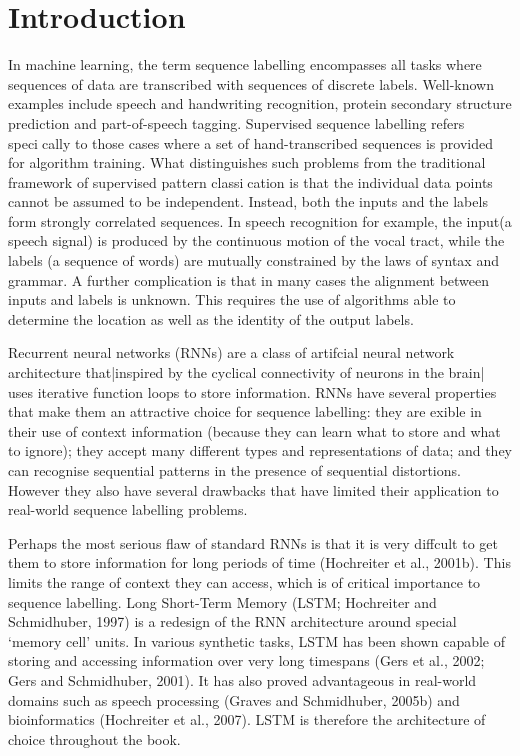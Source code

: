 \chapter{Introduction}
In machine learning, the term sequence labelling encompasses all tasks where sequences of data are transcribed with sequences of discrete labels. Well-known examples include speech and handwriting recognition, protein secondary structure prediction and part-of-speech tagging. Supervised sequence labelling refers specically to those cases where a set of hand-transcribed sequences is provided for algorithm training. What distinguishes such problems from the traditional framework of supervised pattern classication is that the individual data points cannot be assumed to be independent. Instead, both the inputs and the labels form strongly correlated sequences. In speech recognition for example, the input(a speech signal) is produced by the continuous motion of the vocal tract, while the labels (a sequence of words) are mutually constrained by the laws of syntax and grammar. A further complication is that in many cases the alignment between inputs and labels is unknown. This requires the use of algorithms able to determine the location as well as the identity of the output labels.

Recurrent neural networks (RNNs) are a class of artifcial neural network architecture that|inspired by the cyclical connectivity of neurons in the brain| uses iterative function loops to store information. RNNs have several properties that make them an attractive choice for sequence labelling: they are exible in their use of context information (because they can learn what to store and what to ignore); they accept many different types and representations of data; and they can recognise sequential patterns in the presence of sequential distortions. However they also have several drawbacks that have limited their application to real-world sequence labelling problems.

Perhaps the most serious flaw of standard RNNs is that it is very diffcult to get them to store information for long periods of time (Hochreiter et al., 2001b). This limits the range of context they can access, which is of critical importance to sequence labelling. Long Short-Term Memory (LSTM; Hochreiter and Schmidhuber, 1997) is a redesign of the RNN architecture around special `memory cell' units. In various synthetic tasks, LSTM has been shown capable of storing and accessing information over very long timespans (Gers et al., 2002; Gers and Schmidhuber, 2001). It has also proved advantageous in real-world domains such as speech processing (Graves and Schmidhuber, 2005b) and bioinformatics (Hochreiter et al., 2007). LSTM is therefore the architecture of choice throughout the book.

